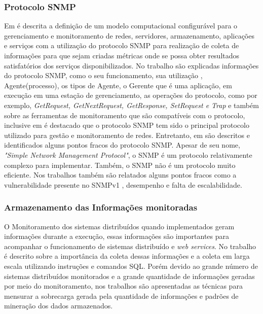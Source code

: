 \subsubsection{Protocolo SNMP}

Em \cite{deGeus} é descrita a definição de um modelo computacional configurável para o gerenciamento e monitoramento de redes, servidores, armazenamento, aplicações e serviços com a utilização do protocolo SNMP para realização de coleta de informações para que sejam criadas métricas onde se possa obter resultados satisfatórios dos serviços disponibilizados. No  trabalho \cite{daSilva} são explicadas informações do protocolo SNMP, como o seu funcionamento, sua utilização , Agente(processo), os tipos de Agente, o Gerente que é uma aplicação, em execução em uma estação de gerenciamento, as operações do protocolo, como por exemplo, \textit{GetRequest, 	GetNextRequest,  GetResponse,  SetRequest  e Trap} e também sobre as ferramentas de monitoramento que são compatíveis com o protocolo, inclusive em \cite{Fraga} é destacado que o protocolo SNMP tem sido o principal protocolo utilizado para gestão e monitoramento de redes. Entretanto, em \cite{deMello} são descritos e identificados alguns pontos fracos do protocolo \acrshort{SNMP}. Apesar  de  seu  nome,  \textit{"Simple  Network  Management  Protocol"},  o  SNMP  é  um protocolo  relativamente  complexo  para  implementar.  Também,  o  SNMP  não  é  um protocolo muito eficiente. Nos trabalhos \cite{phan2009cryptanalysis,subramanyan2000scalable} também são relatados alguns pontos fracos como a vulnerabilidade presente no SNMPv1 , desempenho e falta de escalabilidade.

\subsubsection{Armazenamento das Informações monitoradas}

O Monitoramento dos sistemas distribuídos quando implementados geram informações durante a execução, essas informações são importantes para acompanhar o funcionamento de sistemas distribuído e \textit{web services}. No trabalho \cite{phan2009cryptanalysis} é descrito sobre a importância da coleta dessas informações e a coleta em larga escala utilizando instruções e comandos SQL. Porém devido ao grande número de sistemas distribuídos monitorados e a grande quantidade de informações geradas por meio do monitoramento, nos trabalhos \cite{abdu1996monitoring,hirate2009profiling} são apresentadas as técnicas para mensurar a sobrecarga gerada pela quantidade de informações e padrões de mineração dos dados armazenados.  


